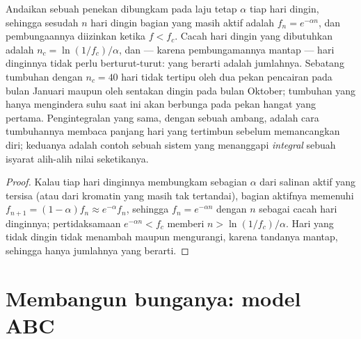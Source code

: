 \begin{theorem}\label{thm:b2:plant-flowering:integration}
Andaikan sebuah penekan dibungkam pada laju tetap $\alpha$ tiap hari
dingin, sehingga sesudah $n$ hari dingin bagian yang masih aktif adalah
$f_n = e^{-\alpha n}$, dan pembungaannya diizinkan ketika $f < f_c$.
Cacah hari dingin yang dibutuhkan adalah $n_c = \ln(1/f_c)/\alpha$, dan
--- karena pembungamannya mantap --- hari dinginnya tidak perlu
berturut-turut: yang berarti adalah jumlahnya. Sebatang tumbuhan dengan
$n_c = 40$ hari tidak tertipu oleh dua pekan pencairan pada bulan
Januari maupun oleh sentakan dingin pada bulan Oktober; tumbuhan yang
hanya mengindera suhu saat ini akan berbunga pada pekan hangat yang
pertama. Pengintegralan yang sama, dengan sebuah ambang, adalah cara
tumbuhannya membaca panjang hari yang tertimbun sebelum memancangkan
diri; keduanya adalah contoh sebuah sistem yang menanggapi
\emph{integral} sebuah isyarat alih-alih nilai seketikanya.
\end{theorem}
\begin{proof}
Kalau tiap hari dinginnya membungkam sebagian $\alpha$ dari salinan
aktif yang tersisa (atau dari kromatin yang masih tak tertandai), bagian
aktifnya memenuhi $f_{n+1} = (1 - \alpha)f_n \approx e^{-\alpha}f_n$,
sehingga $f_n = e^{-\alpha n}$ dengan $n$ sebagai cacah hari dinginnya;
pertidaksamaan $e^{-\alpha n} < f_c$ memberi $n > \ln(1/f_c)/\alpha$.
Hari yang tidak dingin tidak menambah maupun mengurangi, karena
tandanya mantap, sehingga hanya jumlahnya yang berarti.
\end{proof}

\section{Membangun bunganya: model ABC}

